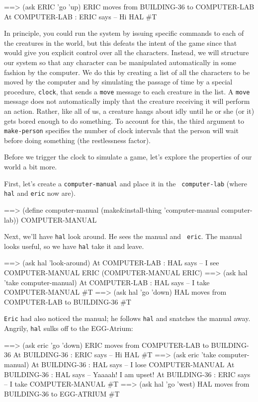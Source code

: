 \beginlisp
==> (ask ERIC 'go 'up)
ERIC moves from BUILDING-36 to COMPUTER-LAB 
At COMPUTER-LAB : ERIC says -- Hi HAL 
\#T
\endlisp

In principle, you could run the system by issuing specific commands to
each of the creatures in the world, but this defeats the intent of the
game since that would give you explicit control over all the
characters.  Instead, we will structure our system so that any
character can be manipulated automatically in some fashion by the
computer.  We do this by creating a list of all the characters to be
moved by the computer and by simulating the passage of time by a
special procedure, {\tt clock}, that sends a {\tt move} message to
each creature in the list.  A {\tt move} message does not
automatically imply that the creature receiving it will perform an
action.  Rather, like all of us, a creature hangs about idly until he
or she (or it) gets bored enough to do something.  To account for
this, the third argument to {\tt make-person} specifies the number of
clock intervals that the person will wait before doing something (the
restlessness factor).

Before we trigger the clock to simulate a game, let's explore the
properties of our world a bit more.

First, let's create a {\tt computer-manual} and place it in the {\tt
computer-lab} (where {\tt hal} and {\tt eric} now are).

\beginlisp
==> (define computer-manual (make\&install-thing 'computer-manual computer-lab))
COMPUTER-MANUAL
\endlisp

Next, we'll have {\tt hal} look around.  He sees the manual and {\tt
eric}.  The manual looks useful, so we have {\tt hal} take it and leave.

\beginlisp
==> (ask hal 'look-around)
At COMPUTER-LAB : HAL says -- I see COMPUTER-MANUAL ERIC 
(COMPUTER-MANUAL ERIC)
==> (ask hal 'take computer-manual)
At COMPUTER-LAB : HAL says -- I take COMPUTER-MANUAL 
\#T
==> (ask hal 'go 'down)
HAL moves from COMPUTER-LAB to BUILDING-36 
\#T
\endlisp

{\tt Eric} had also noticed the manual; he follows {\tt hal} and
snatches the manual away.  Angrily, {\tt hal} sulks off to the
EGG-Atrium:

\beginlisp
==> (ask eric 'go 'down)
ERIC moves from COMPUTER-LAB to BUILDING-36 
At BUILDING-36 : ERIC says -- Hi HAL 
\#T
==> (ask eric 'take computer-manual)
At BUILDING-36 : HAL says -- I lose COMPUTER-MANUAL 
At BUILDING-36 : HAL says -- Yaaaah! I am upset! 
At BUILDING-36 : ERIC says -- I take COMPUTER-MANUAL 
\#T
==> (ask hal 'go 'west)
HAL moves from BUILDING-36 to EGG-ATRIUM
\#T
\endlisp
 
